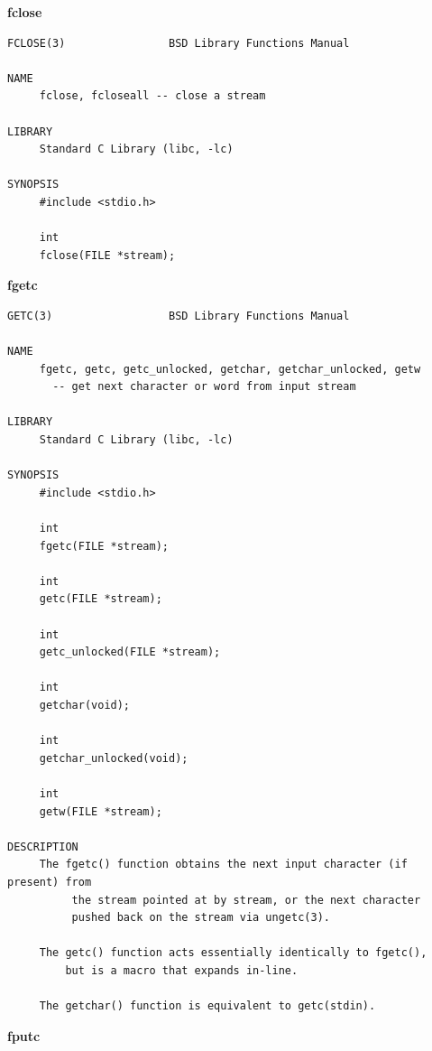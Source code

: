 \textbf{fclose}
\begin{lstlisting}
FCLOSE(3)                BSD Library Functions Manual  

NAME
     fclose, fcloseall -- close a stream

LIBRARY
     Standard C Library (libc, -lc)

SYNOPSIS
     #include <stdio.h>

     int
     fclose(FILE *stream);
\end{lstlisting}
\textbf{fgetc}
\begin{lstlisting}
GETC(3)                  BSD Library Functions Manual

NAME
     fgetc, getc, getc_unlocked, getchar, getchar_unlocked, getw 
       -- get next character or word from input stream

LIBRARY
     Standard C Library (libc, -lc)

SYNOPSIS
     #include <stdio.h>

     int
     fgetc(FILE *stream);

     int
     getc(FILE *stream);

     int
     getc_unlocked(FILE *stream);

     int
     getchar(void);

     int
     getchar_unlocked(void);

     int
     getw(FILE *stream);

DESCRIPTION
     The fgetc() function obtains the next input character (if present) from
          the stream pointed at by stream, or the next character 
          pushed back on the stream via ungetc(3).

     The getc() function acts essentially identically to fgetc(), 
         but is a macro that expands in-line.

     The getchar() function is equivalent to getc(stdin).
\end{lstlisting}
\textbf{fputc}
